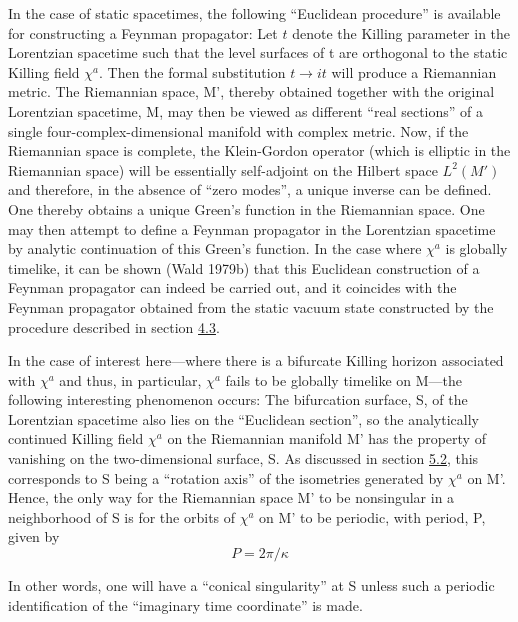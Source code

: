\documentclass[11pt,a4paper]{article}
\begin{document}
In the case of static spacetimes, the following ``Euclidean procedure'' is available for constructing a Feynman propagator: Let \(t\) denote the Killing parameter in the Lorentzian spacetime such that the level surfaces of t are orthogonal to the static Killing field \(\chi^a\). Then the formal substitution \(t\rightarrow it\) will produce a Riemannian metric. The Riemannian space, M', thereby obtained together with the original Lorentzian spacetime, M, may then be viewed as different ``real sections'' of a single four-complex-dimensional manifold with complex metric. Now, if the Riemannian space is complete, the Klein-Gordon operator (which is elliptic in the Riemannian space) will be essentially self-adjoint on the Hilbert space \(L^2(M')\) and therefore, in \hypertarget{source-144}{} the absence of ``zero modes'', a unique inverse can be defined. One thereby obtains a unique Green's function in the Riemannian space. One may then attempt to define a Feynman propagator in the Lorentzian spacetime by analytic continuation of this Green's function. In the case where \(\chi^a\) is globally timelike, it can be shown (Wald 1979b) that this Euclidean construction of a Feynman propagator can indeed be carried out, and it coincides with the Feynman propagator obtained from the static vacuum state constructed by the procedure described in section \hyperlink{sec:4.3}{4.3}.

In the case of interest here---where there is a bifurcate Killing horizon associated with \(\chi^a\) and thus, in particular, \(\chi^a\) fails to be globally timelike on M---the following interesting phenomenon occurs: The bifurcation surface, S, of the Lorentzian spacetime also lies on the ``Euclidean section'', so the analytically continued Killing field \(\chi^a\) on the Riemannian manifold M' has the property of vanishing on the two-dimensional surface, S. As discussed in section \hyperlink{sec:5.2}{5.2}, this corresponds to S being a ``rotation axis'' of the isometries generated by \(\chi^a\) on M'. Hence, the only way for the Riemannian space M' to be nonsingular in a neighborhood of S is for the orbits of \(\chi^a\) on M' to be periodic, with period, P, given by
\begin{equation*}
P = 2\pi/\kappa \tag{5.3.10}\label{eq:5.3.10}
\end{equation*}

In other words, one will have a ``conical singularity'' at S unless such a periodic identification of the ``imaginary time coordinate'' is made.
\end{document}
